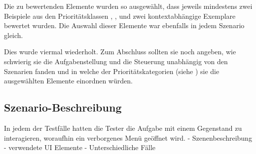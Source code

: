 			Die zu bewertenden Elemente wurden so ausgewählt, dass jeweils mindestens zwei Beispiele aus den Prioritätsklassen , ,  und zwei kontextabhängige Exemplare bewertet wurden.
			Die Auswahl dieser Elemente war ebenfalls in jedem Szenario gleich.
			
			Dies wurde viermal wiederholt. Zum Abschluss sollten sie noch angeben, wie schwierig sie die Aufgabenstellung und die Steuerung unabhängig von den Szenarien fanden und in welche der Prioritätskategorien (siehe ) sie die ausgewählten Elemente einordnen würden.
		
		\subsection{Szenario-Beschreibung}\label{chapter:szenario}
			In jedem der Testfälle hatten die Tester die Aufgabe mit einem Gegenstand zu interagieren, woraufhin ein verborgenes Menü geöffnet wird.
			- Szenenbeschreibung
			- verwendete UI Elemente
			- Unterschiedliche Fälle
		